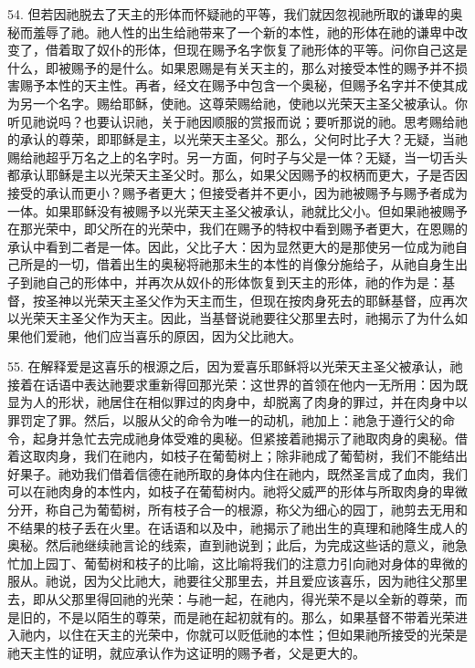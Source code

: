 54. 但若因祂脱去了天主的形体而怀疑祂的平等，我们就因忽视祂所取的谦卑的奥秘而羞辱了祂。祂人性的出生给祂带来了一个新的本性，祂的形体在祂的谦卑中改变了，借着取了奴仆的形体，但现在赐予名字恢复了祂形体的平等。问你自己这是什么，即被赐予的是什么。如果恩赐是有关天主的，那么对接受本性的赐予并不损害赐予本性的天主性。再者，经文在赐予中包含一个奥秘，但赐予名字并不使其成为另一个名字。赐给耶稣，使祂。这尊荣赐给祂，使祂以光荣天主圣父被承认。你听见祂说吗？也要认识祂，关于祂因顺服的赏报而说；要听那说的祂。思考赐给祂的承认的尊荣，即耶稣是主，以光荣天主圣父。那么，父何时比子大？无疑，当祂赐给祂超乎万名之上的名字时。另一方面，何时子与父是一体？无疑，当一切舌头都承认耶稣是主以光荣天主圣父时。那么，如果父因赐予的权柄而更大，子是否因接受的承认而更小？赐予者更大；但接受者并不更小，因为祂被赐予与赐予者成为一体。如果耶稣没有被赐予以光荣天主圣父被承认，祂就比父小。但如果祂被赐予在那光荣中，即父所在的光荣中，我们在赐予的特权中看到赐予者更大，在恩赐的承认中看到二者是一体。因此，父比子大：因为显然更大的是那使另一位成为祂自己所是的一切，借着出生的奥秘将祂那未生的本性的肖像分施给子，从祂自身生出子到祂自己的形体中，并再次从奴仆的形体恢复到天主的形体，祂的作为是：基督，按圣神以光荣天主圣父作为天主而生，但现在按肉身死去的耶稣基督，应再次以光荣天主圣父作为天主。因此，当基督说祂要往父那里去时，祂揭示了为什么如果他们爱祂，他们应当喜乐的原因，因为父比祂大。\par

55. 在解释爱是这喜乐的根源之后，因为爱喜乐耶稣将以光荣天主圣父被承认，祂接着在话语中表达祂要求重新得回那光荣：这世界的首领在他内一无所用：因为既显为人的形状，祂居住在相似罪过的肉身中，却脱离了肉身的罪过，并在肉身中以罪罚定了罪。然后，以服从父的命令为唯一的动机，祂加上：祂急于遵行父的命令，起身并急忙去完成祂身体受难的奥秘。但紧接着祂揭示了祂取肉身的奥秘。借着这取肉身，我们在祂内，如枝子在葡萄树上；除非祂成了葡萄树，我们不能结出好果子。祂劝我们借着信德在祂所取的身体内住在祂内，既然圣言成了血肉，我们可以在祂肉身的本性内，如枝子在葡萄树内。祂将父威严的形体与所取肉身的卑微分开，称自己为葡萄树，所有枝子合一的根源，称父为细心的园丁，祂剪去无用和不结果的枝子丢在火里。在话语和以及中，祂揭示了祂出生的真理和祂降生成人的奥秘。然后祂继续祂言论的线索，直到祂说到；此后，为完成这些话的意义，祂急忙加上园丁、葡萄树和枝子的比喻，这比喻将我们的注意力引向祂对身体的卑微的服从。祂说，因为父比祂大，祂要往父那里去，并且爱应该喜乐，因为祂往父那里去，即从父那里得回祂的光荣：与祂一起，在祂内，得光荣不是以全新的尊荣，而是旧的，不是以陌生的尊荣，而是祂在起初就有的。那么，如果基督不带着光荣进入祂内，以住在天主的光荣中，你就可以贬低祂的本性；但如果祂所接受的光荣是祂天主性的证明，就应承认作为这证明的赐予者，父是更大的。\par

